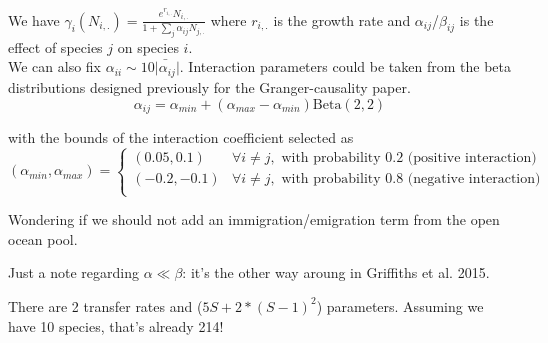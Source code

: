 \documentclass[a4paper,10pt]{article}
\begin{document}
 We have $\gamma_i(N_{i,.})=\frac{e^{r_{i,.}}N_{i,.}}{1+\sum_j\alpha_{ij}N_{j,.}}$ where $r_{i,.}$ is the growth rate and $\alpha_{ij}$/$\beta_{ij}$ is the effect of species $j$ on species $i$. \\
 
 We can also fix $\alpha_{ii} \sim 10\bar{|\alpha_{ij}}|$. Interaction parameters could be taken from the beta distributions designed previously for the Granger-causality paper.
 \begin{equation}
\alpha_{ij}=\alpha_{min}+(\alpha_{max}-\alpha_{min})\text{Beta}(2,2)\label{eq:coef}
\end{equation}

with the bounds of the interaction coefficient selected as\\

\begin{equation}
(\alpha_{min},\alpha_{max})=\begin{cases}
(0.05,0.1) & \forall i\neq j,\text{ with probability 0.2 (positive interaction)}\\
(-0.2,-0.1) & \forall i\neq j,\text{ with probability 0.8 (negative interaction)}\\
\end{cases}\label{eq:coef_condition}
\end{equation}

 
 Wondering if we should not add an immigration/emigration term from the open ocean pool.
 
Just a note regarding $\alpha \ll \beta$: it's the other way aroung in Griffiths et al. 2015. 
 
 
 There are 2 transfer rates and ($5S + 2*(S-1)^2$) parameters. Assuming we have 10 species, that's already 214!
   
\end{document}
